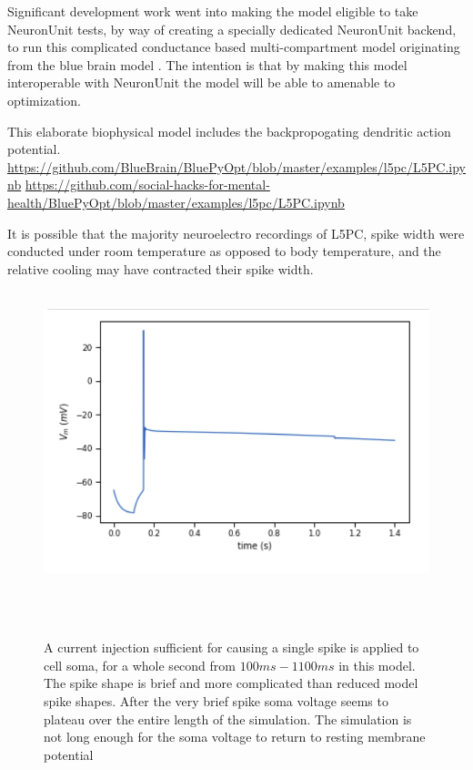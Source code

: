 

Significant development work went into making the model eligible to take NeuronUnit tests, by way of creating a specially dedicated NeuronUnit backend, to run this complicated conductance based multi-compartment model originating from the blue brain model \cite{markram2015reconstruction}. The intention is that by making this model interoperable with NeuronUnit the model will be able to amenable to optimization.


This elaborate biophysical model includes the backpropogating dendritic action potential.
\url{https://github.com/BlueBrain/BluePyOpt/blob/master/examples/l5pc/L5PC.ipynb}
\url{https://github.com/social-hacks-for-mental-health/BluePyOpt/blob/master/examples/l5pc/L5PC.ipynb}


It is possible that the majority neuroelectro recordings of L5PC, spike width were conducted under room temperature as opposed to body temperature, and the relative cooling may have contracted their spike width.
\cite{goldin2017temperature}

\begin{figure}
  \centering
    \includegraphics[scale=0.8]{figures/correct_active_l5pc.png}
    \caption[Short duration spike in the L5PC model]{A current injection sufficient for causing a single spike is applied to cell soma, for a whole second from $100ms-1100ms$ in this model. The spike shape is brief and more complicated than reduced model spike shapes. After the very brief spike soma voltage seems to plateau over the entire length of the simulation. The simulation is not long enough for the soma voltage to return to resting membrane potential}
  \label{fig:sub1}
\end{figure}

